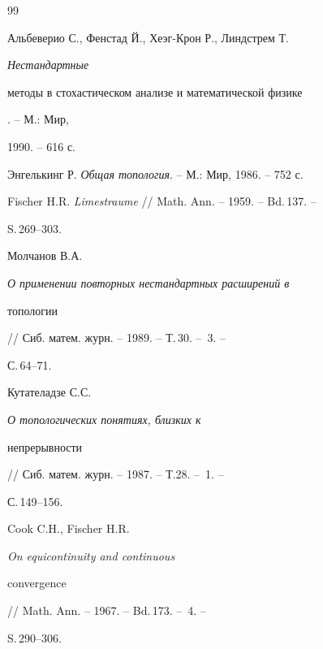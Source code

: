 \begin{thebibliography}{99}


Альбеверио С., Фенстад Й., Хеэг-Крон Р., Линдстрем Т. {\em Нестандартные


методы в стохастическом анализе и математической физике}. -- М.: Мир,


1990. -- 616 с.




Энгелькинг Р. {\em Общая топология}. -- М.: Мир, 1986. -- 752 с.




Fischer H.R. {\em Limestraume} // Math. Ann. -- 1959. -- Bd.\,137. --


S.\,269--303.




Молчанов В.А. {\em О применении повторных нестандартных расширений в


топологии} // Сиб. матем. журн. -- 1989. -- Т.\,30. -- \No\,3. --


С.\,64--71.




Кутателадзе С.С. {\em О топологических понятиях, близких к


непрерывности} // Сиб. матем. журн. -- 1987. -- Т.28. -- \No\,1. --


С.\,149--156.




Cook C.H., Fischer H.R. {\em On equicontinuity and continuous


convergence} // Math. Ann. -- 1967. -- Bd.\,173. -- \No\,4. --


S.\,290--306.





\end{thebibliography}





\vskip 2cm









\label{end}





